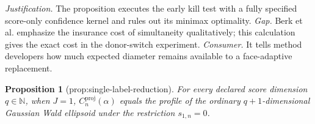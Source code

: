 \documentclass{article}
\newtheorem{proposition}{Proposition}
\begin{document}
\par\smallskip\noindent \textit{Justification.} The proposition executes the early kill test with a fully specified score-only confidence kernel and rules out its minimax optimality. \textit{Gap.} Berk et al. emphasize the insurance cost of simultaneity qualitatively; this calculation gives the exact cost in the donor-switch experiment. \textit{Consumer.} It tells method developers how much expected diameter remains available to a face-adaptive replacement.

\begin{proposition}[prop:single-label-reduction]\label{prop:single-label-reduction}
For every declared score dimension \(q\in\mathbb N\), when \(J=1\), \(C_n^{\mathrm{proj}}(\alpha)\) equals the profile of the ordinary \(q+1\)-dimensional Gaussian Wald ellipsoid under the restriction \(s_{1,n}=0\).
\end{proposition}
\end{document}
